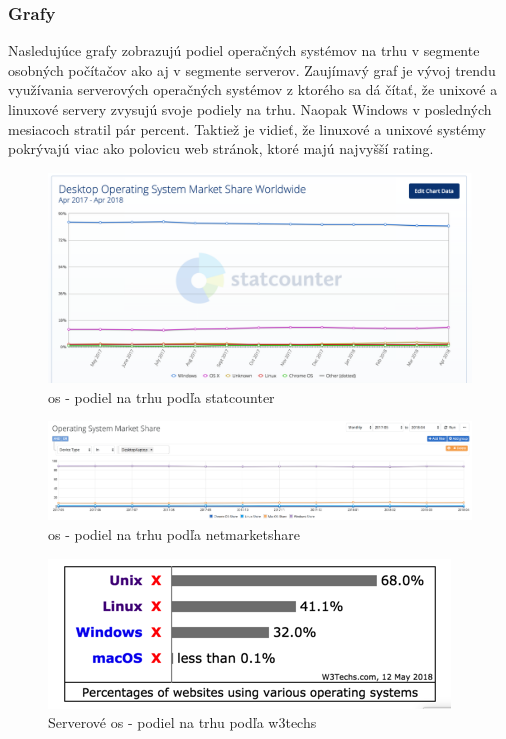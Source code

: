 \subsubsection{Grafy}
\indent Nasledujúce grafy zobrazujú podiel operačných systémov na trhu v segmente osobných počítačov ako aj v segmente serverov. Zaujímavý graf je vývoj trendu využívania serverových operačných systémov z ktorého sa dá čítať, že unixové a linuxové servery zvysujú svoje podiely na trhu. Naopak Windows v posledných mesiacoch stratil pár percent. Taktiež je vidieť, že linuxové a unixové systémy pokrývajú viac ako polovicu web stránok, ktoré majú najvyšší rating.
\begin{figure}[!htbp]
	\centering
	\includegraphics[width=\linewidth]{img/statcounter.png}
	\caption{\gls{os} - podiel na trhu podľa statcounter\cite{statcounter}}
	\label{fig:test}
	
\end{figure}
\begin{figure}[!htbp]
	\centering
	\includegraphics[width=\linewidth]{img/netmarketshare.png}
	\caption{\gls{os} - podiel na trhu podľa netmarketshare\cite{netmarketshare}}
	\label{fig:test}
	
\end{figure}
\begin{figure}[!htbp]
	\centering
	\includegraphics[scale=0.4]{img/usg_server.png}
	\caption{Serverové \gls{os} - podiel na trhu podľa w3techs\cite{pop}}
	\label{fig:test}
	
\end{figure}
